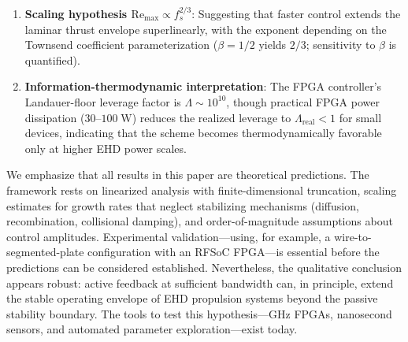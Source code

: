\documentclass[12pt,twocolumn]{article}
\begin{document}
\begin{enumerate}
  \item \textbf{Scaling hypothesis $\mathrm{Re}_{\max} \propto
    f_s^{2/3}$}:
    Suggesting that faster control extends the laminar thrust envelope
    superlinearly, with the exponent depending on the Townsend
    coefficient parameterization ($\beta = 1/2$ yields $2/3$;
    sensitivity to $\beta$ is quantified).

  \item \textbf{Information-thermodynamic interpretation}:
    The FPGA controller's Landauer-floor leverage factor is
    $\Lambda \sim 10^{10}$, though practical FPGA power dissipation
    ($30$--$100\;\mathrm{W}$) reduces the realized leverage to
    $\Lambda_{\mathrm{real}} < 1$ for small devices, indicating that
    the scheme becomes thermodynamically favorable only at higher EHD
    power scales.
\end{enumerate}

We emphasize that all results in this paper are theoretical
predictions. The framework rests on linearized analysis with
finite-dimensional truncation, scaling estimates for growth rates
that neglect stabilizing mechanisms (diffusion, recombination,
collisional damping), and order-of-magnitude assumptions about
control amplitudes. Experimental validation---using, for example, a
wire-to-segmented-plate configuration with an RFSoC FPGA---is
essential before the predictions can be considered established.
Nevertheless, the qualitative conclusion appears robust: active
feedback at sufficient bandwidth can, in principle, extend the
stable operating envelope of EHD propulsion systems beyond the
passive stability boundary. The tools to test this hypothesis---GHz
FPGAs, nanosecond sensors, and automated parameter exploration---exist
today.
\end{document}
